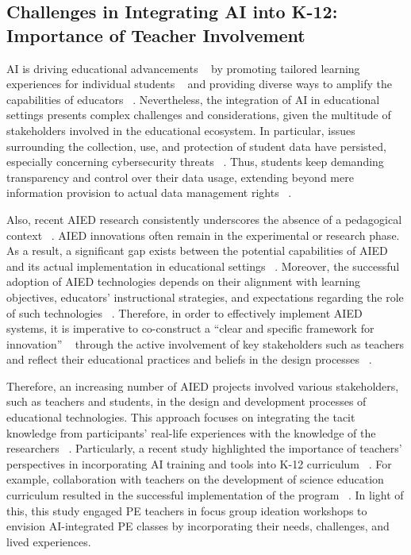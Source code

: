\subsection{Challenges in Integrating AI into K-12: Importance of Teacher Involvement}
AI is driving educational advancements ~\cite{alberola2016artificial, chakroun2019artificial, park2016teachers} by promoting tailored learning experiences for individual students ~\cite{bernacki2020towards, samani2017bridging} and providing diverse ways to amplify the capabilities of educators ~\cite{ZHANG2021100025, edwards2018not}. Nevertheless, the integration of AI in educational settings presents complex challenges and considerations, given the multitude of stakeholders involved in the educational ecosystem. In particular, issues surrounding the collection, use, and protection of student data have persisted, especially concerning cybersecurity threats  ~\cite{grayson1978education, huang2023ethics}. Thus, students keep demanding transparency and control over their data usage, extending beyond mere information provision to actual data management rights ~\cite{jones2019learning, slade2014student, sun2019s}.

Also, recent AIED research consistently underscores the absence of a pedagogical context ~\cite{Chen2020application, hinojo2019artificial, zawacki2019systematic, tang2023trends}. AIED innovations often remain in the experimental or research phase. As a result, a significant gap exists between the potential capabilities of AIED and its actual implementation in educational settings ~\cite{bates2020can, kabudi2021ai}. Moreover, the successful adoption of AIED technologies depends on their alignment with learning objectives, educators' instructional strategies, and expectations regarding the role of such technologies ~\cite{Ertmer2012Teacher, Mama2013Developing}. Therefore, in order to effectively implement AIED systems, it is imperative to co-construct a ``clear and specific framework for innovation'' ~\cite{roschelle2006co} through the active involvement of key stakeholders such as teachers and reflect their educational practices and beliefs in the design processes ~\cite{Ertmer2012Teacher, Mama2013Developing}.

Therefore, an increasing number of AIED projects involved various stakeholders, such as teachers and students, in the design and development processes of educational technologies. This approach focuses on integrating the tacit knowledge from participants' real-life experiences with the knowledge of the researchers ~\cite{bodker2022participatory, mckercher2022beyond, schuler1993participatory}. Particularly, a recent study highlighted the importance of teachers' perspectives in incorporating AI training and tools into K-12 curriculum ~\cite{Lin2021Engaging}. For example, collaboration with teachers on the development of science education curriculum resulted in the successful implementation of the program ~\cite{durall2019co}. In light of this, this study engaged PE teachers in focus group ideation workshops to envision AI-integrated PE classes by incorporating their needs, challenges, and lived experiences.



